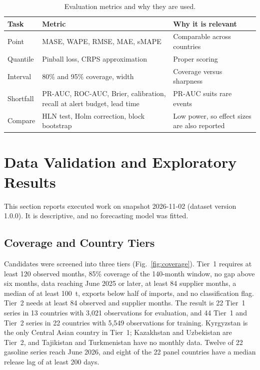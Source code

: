 \documentclass[conference]{IEEEtran}
\begin{document}
\begin{table}[t]
\centering
\caption{Evaluation metrics and why they are used.}
\label{tab:metrics}
\small
\begin{tabularx}{\columnwidth}{@{}L{1.3cm} L{2.5cm} X@{}}
\toprule
Task & Metric & Why it is relevant\\
\midrule
Point & MASE, WAPE, RMSE, MAE, sMAPE & Comparable across countries \cite{hyndman2006}\\
Quantile & Pinball loss, CRPS approximation & Proper scoring \cite{gneiting2007}\\
Interval & 80\% and 95\% coverage, width & Coverage versus sharpness\\
Shortfall & PR-AUC, ROC-AUC, Brier, calibration, recall at alert budget, lead time & PR-AUC suits rare events \cite{saito2015,brier1950}\\
Compare & HLN test, Holm correction, block bootstrap & Low power, so effect sizes are also reported\\
\bottomrule
\end{tabularx}
\end{table}

\section{Data Validation and Exploratory Results}\label{sec:data}
This section reports executed work on snapshot 2026-11-02 (dataset version 1.0.0). It is descriptive, and no forecasting model was fitted.

\subsection{Coverage and Country Tiers}
Candidates were screened into three tiers (Fig.~\ref{fig:coverage}). Tier~1 requires at least 120 observed months, 85\% coverage of the 140-month window, no gap above six months, data reaching June 2025 or later, at least 84 supplier months, a median of at least 100~t, exports below half of imports, and no classification flag. Tier~2 needs at least 84 observed and supplier months. The result is 22 Tier~1 series in 13 countries with 3,021 observations for evaluation, and 44 Tier~1 and Tier~2 series in 22 countries with 5,549 observations for training. Kyrgyzstan is the only Central Asian country in Tier~1; Kazakhstan and Uzbekistan are Tier~2, and Tajikistan and Turkmenistan have no monthly data. Twelve of 22 gasoline series reach June 2026, and eight of the 22 panel countries have a median release lag of at least 200 days.
\end{document}
